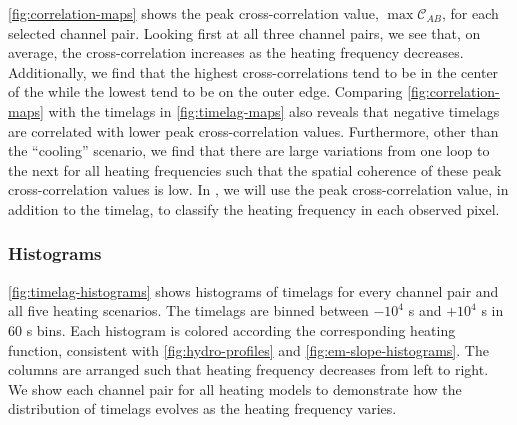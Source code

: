 \autoref{fig:correlation-maps} shows the peak cross-correlation value, $\max\mathcal{C}_{AB}$, for each selected channel pair. Looking first at all three channel pairs, we see that, on average, the cross-correlation increases as the heating frequency decreases. Additionally, we find that the highest cross-correlations tend to be in the center of the \AR{} while the lowest tend to be on the outer edge. Comparing \autoref{fig:correlation-maps} with the timelags in \autoref{fig:timelag-maps} also reveals that negative timelags are correlated with lower peak cross-correlation values. Furthermore, other than the ``cooling'' scenario, we find that there are large variations from one loop to the next for all heating frequencies such that the spatial coherence of these peak cross-correlation values is low. In , we will use the peak cross-correlation value, in addition to the timelag, to classify the heating frequency in each observed pixel.

\subsubsection{Histograms}\label{timelag_histograms}

\autoref{fig:timelag-histograms} shows histograms of timelags for every channel pair and all five heating scenarios. The timelags are binned between $-10^4$ s and $+10^4$ s in 60 s bins. Each histogram is colored according the corresponding heating function, consistent with \autoref{fig:hydro-profiles} and \autoref{fig:em-slope-histograms}. The columns are arranged such that heating frequency decreases from left to right. We show each channel pair for all heating models to demonstrate how the distribution of timelags evolves as the heating frequency varies.


